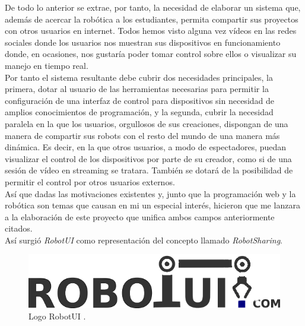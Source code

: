 De todo lo anterior se extrae, por tanto, la necesidad de elaborar un sistema que, además de acercar la robótica a los estudiantes, permita compartir sus proyectos con otros usuarios en internet. Todos hemos
visto alguna vez vídeos en las redes sociales donde los usuarios nos muestran sus dispositivos en funcionamiento donde, en ocasiones, nos gustaría poder tomar control sobre ellos o visualizar su manejo en tiempo real.\\

Por tanto el sistema resultante debe cubrir dos necesidades principales, la primera, dotar al usuario de las herramientas necesarias para permitir la configuración de una interfaz de control para 
dispositivos sin necesidad de amplios conocimientos de programación, y la segunda, cubrir la necesidad paralela en la que los usuarios, orgullosos de sus creaciones, dispongan de una manera de 
compartir sus robots con el resto del mundo de una manera más dinámica. Es decir, en la que otros usuarios, a modo de espectadores, puedan visualizar el control de los dispositivos por parte de 
su creador, como si de una sesión de vídeo en streaming se tratara. También se dotará de la posibilidad de permitir el control por otros usuarios externos.\\

Así que dadas las motivaciones existentes y, junto que la programación web y la robótica son temas que causan en mi un especial interés, hicieron que me lanzara a la elaboración de este
proyecto que unifica ambos campos anteriormente citados.\\

Así surgió \emph{RobotUI} como representación del concepto llamado \textit{RobotSharing}.\\

\begin{figure}[H]
  \begin{center}
    \includegraphics[scale=0.5]{imagenes/logotipo.png}
  \end{center}
  \label{fig:logo}
 \caption{Logo RobotUI \protect\footnotemark.}
\end{figure}


